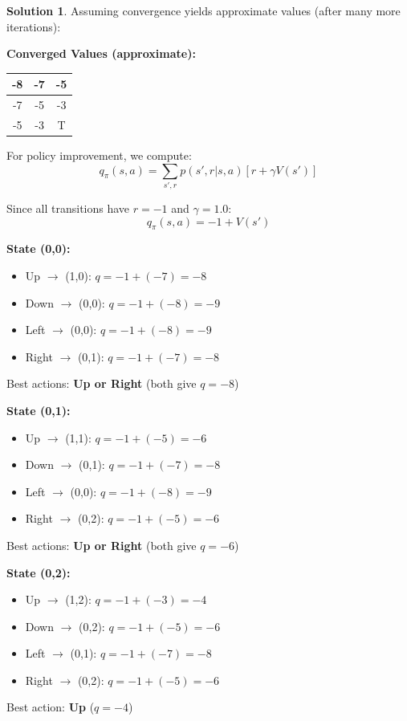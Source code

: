 \documentclass[11pt]{article}
\theoremstyle{definition}
\newtheorem*{solution}{Solution}
\begin{document}
\begin{solution}
Assuming convergence yields approximate values (after many more iterations):

\begin{center}
\textbf{Converged Values (approximate):}
\begin{tabular}{|c|c|c|}
\hline
-8 & -7 & -5 \\
\hline
-7 & -5 & -3 \\
\hline
-5 & -3 & T \\
\hline
\end{tabular}
\end{center}

For policy improvement, we compute:
\[
q_\pi(s,a) = \sum_{s',r} p(s',r|s,a)[r + \gamma V(s')]
\]

Since all transitions have $r = -1$ and $\gamma = 1.0$:
\[
q_\pi(s,a) = -1 + V(s')
\]

\textbf{State (0,0):}
\begin{itemize}
    \item Up $\to$ (1,0): $q = -1 + (-7) = -8$
    \item Down $\to$ (0,0): $q = -1 + (-8) = -9$
    \item Left $\to$ (0,0): $q = -1 + (-8) = -9$
    \item Right $\to$ (0,1): $q = -1 + (-7) = -8$
\end{itemize}
Best actions: \textbf{Up or Right} (both give $q = -8$)

\textbf{State (0,1):}
\begin{itemize}
    \item Up $\to$ (1,1): $q = -1 + (-5) = -6$
    \item Down $\to$ (0,1): $q = -1 + (-7) = -8$
    \item Left $\to$ (0,0): $q = -1 + (-8) = -9$
    \item Right $\to$ (0,2): $q = -1 + (-5) = -6$
\end{itemize}
Best actions: \textbf{Up or Right} (both give $q = -6$)

\textbf{State (0,2):}
\begin{itemize}
    \item Up $\to$ (1,2): $q = -1 + (-3) = -4$
    \item Down $\to$ (0,2): $q = -1 + (-5) = -6$
    \item Left $\to$ (0,1): $q = -1 + (-7) = -8$
    \item Right $\to$ (0,2): $q = -1 + (-5) = -6$
\end{itemize}
Best action: \textbf{Up} ($q = -4$)


\end{solution}
\end{document}
